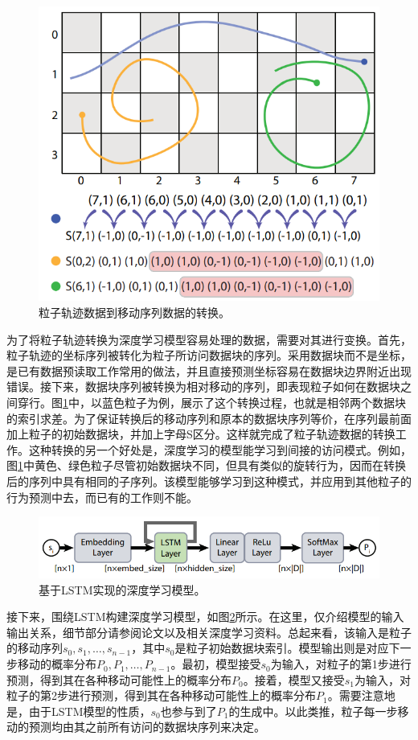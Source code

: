 \begin{figure}[!tb]
  \centering
  \includegraphics[width=.65\linewidth]{image/prefetch/lstm_fig1.png}
  \caption{
    粒子轨迹数据到移动序列数据的转换\parencite{Hong2018LSTM}。
  }
  \label{fig:lstm_fig1}
\end{figure}


为了将粒子轨迹转换为深度学习模型容易处理的数据，需要对其进行变换。首先，粒子轨迹的坐标序列被转化为粒子所访问数据块的序列。采用数据块而不是坐标，是已有数据预读取工作常用的做法，并且直接预测坐标容易在数据块边界附近出现错误。接下来，数据块序列被转换为相对移动的序列，即表现粒子如何在数据块之间穿行。图\ref{fig:lstm_fig1}中，以蓝色粒子为例，展示了这个转换过程，也就是相邻两个数据块的索引求差。为了保证转换后的移动序列和原本的数据块序列等价，在序列最前面加上粒子的初始数据块，并加上字母S区分。这样就完成了粒子轨迹数据的转换工作。这种转换的另一个好处是，深度学习的模型能学习到间接的访问模式。例如，图\ref{fig:lstm_fig1}中黄色、绿色粒子尽管初始数据块不同，但具有类似的旋转行为，因而在转换后的序列中具有相同的子序列。该模型能够学习到这种模式，并应用到其他粒子的行为预测中去，而已有的工作则不能。

\begin{figure}[!tb]
  \centering
  \includegraphics[width=.85\linewidth]{image/prefetch/lstm_fig2.png}
  \caption{
    基于LSTM实现的深度学习模型\parencite{Hong2018LSTM}。
  }
  \label{fig:lstm_fig2}
\end{figure}

接下来，围绕LSTM构建深度学习模型，如图\ref{fig:lstm_fig2}所示。在这里，仅介绍模型的输入输出关系，细节部分请参阅论文以及相关深度学习资料。总起来看，该输入是粒子的移动序列$s_0, s_1, …, s_{n-1}$，其中$s_0$是粒子初始数据块索引。模型输出则是对应下一步移动的概率分布$P_0,P_1,…,P_{n-1}$。最初，模型接受$s_0$为输入，对粒子的第1步进行预测，得到其在各种移动可能性上的概率分布$P_0$。接着，模型又接受$s_1$为输入，对粒子的第2步进行预测，得到其在各种移动可能性上的概率分布$P_1$。需要注意地是，由于LSTM模型的性质，$s_0$也参与到了$P_1$的生成中。以此类推，粒子每一步移动的预测均由其之前所有访问的数据块序列来决定。

